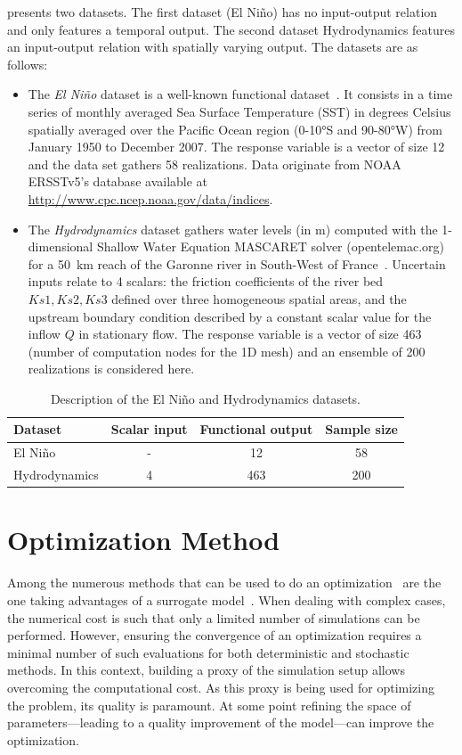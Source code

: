  presents two datasets. The first dataset (El Ni\~no) has no input-output relation and only features a temporal output. The second dataset Hydrodynamics features an input-output relation with spatially varying output. The datasets are as follows:
\begin{itemize}
\item The \emph{El Ni\~{n}o} dataset is a well-known functional dataset~\citep{Hyndman2009}. It consists in a time series of monthly averaged Sea Surface Temperature (SST) in degrees Celsius spatially averaged over the Pacific Ocean region (0-10°S and 90-80°W) from January 1950 to December 2007. The response variable is a vector of size 12 and the data set gathers 58 realizations. Data originate from NOAA ERSSTv5's database available at \href{http://www.cpc.ncep.noaa.gov/data/indices}{http://www.cpc.ncep.noaa.gov/data/indices}.
\item The \emph{Hydrodynamics} dataset gathers water levels (in m) computed with the 1-dimensional Shallow Water Equation MASCARET solver (opentelemac.org) for a 50~km reach of the Garonne river in South-West of France~\citep{Roy2017c}. Uncertain inputs relate to 4 scalars: the friction coefficients of the river bed $Ks1, Ks2, Ks3$ defined over three homogeneous spatial areas, and the upstream boundary condition described by a constant scalar value for the inflow $Q$ in stationary flow. The response variable is a vector of size 463 (number of computation nodes for the 1D mesh) and an ensemble of 200 realizations is considered here. 
\end{itemize}

\begin{table}[!ht]
\centering
\begin{tabular}{lccc}
\toprule
Dataset & Scalar input & Functional output & Sample size\\
\midrule %
El Ni\~no & - & 12 & 58\\
Hydrodynamics & 4 & 463 & 200\\
\bottomrule
\end{tabular}
\caption{Description of the El Ni\~no and Hydrodynamics datasets.}
\label{tab:dataset}
\end{table}

\chapter{Optimization Method}
\label{sec:optim_method}

Among the numerous methods that can be used to do an optimization~\cite{Cavazzuti2013} are the one taking advantages of a surrogate model~\cite{forrester2009}. When dealing with complex cases, the numerical cost is such that only a limited number of simulations can be performed. However, ensuring the convergence of an optimization requires a minimal number of such evaluations for both deterministic and stochastic methods. In this context, building a proxy of the simulation setup allows overcoming the computational cost. As this proxy is being used for optimizing the problem, its quality is paramount. At some point refining the space of parameters---leading to a quality improvement of the model---can improve the optimization.

